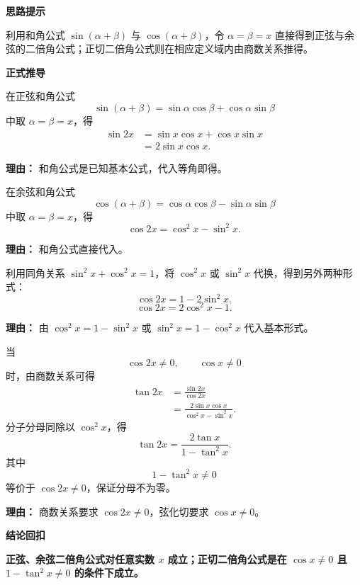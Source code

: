 \begin{proofbox}

	\textbf{\textcolor{CProof}{思路提示}}

	利用和角公式 $\sin(\alpha+\beta)$ 与 $\cos(\alpha+\beta)$，令 $\alpha=\beta=x$ 直接得到正弦与余弦的二倍角公式；正切二倍角公式则在相应定义域内由商数关系推得。

	\medskip
	\textbf{\textcolor{CProof}{正式推导}}
	\begin{description}[style=nextline, leftmargin=2.8em, labelsep=0.5em, itemsep=0.55em]
		\item[\textbf{步骤一（正弦二倍角）：}]
		      在正弦和角公式
		      \[
			      \sin(\alpha+\beta) = \sin\alpha\cos\beta + \cos\alpha\sin\beta
		      \]
		      中取 $\alpha = \beta = x$，得
		      \[
			      \begin{aligned}
				      \sin 2x & = \sin x \cos x + \cos x \sin x \\
				              & = 2\sin x \cos x.
			      \end{aligned}
		      \]
		      \par\textbf{理由：} 和角公式是已知基本公式，代入等角即得。

		\item[\textbf{步骤二（余弦基本形式）：}]
		      在余弦和角公式
		      \[
			      \cos(\alpha+\beta) = \cos\alpha\cos\beta - \sin\alpha\sin\beta
		      \]
		      中取 $\alpha = \beta = x$，得
		      \[
			      \cos 2x = \cos^2 x - \sin^2 x.
		      \]
		      \par\textbf{理由：} 和角公式直接代入。

		\item[\textbf{步骤三（余弦变形）：}]
		      利用同角关系 $\sin^2 x + \cos^2 x = 1$，将 $\cos^2 x$ 或 $\sin^2 x$ 代换，得到另外两种形式：
		      \[
			      \cos 2x = 1 - 2\sin^2 x.
		      \]
		      \[
			      \cos 2x = 2\cos^2 x - 1.
		      \]
		      \par\textbf{理由：} 由 $\cos^2 x = 1 - \sin^2 x$ 或 $\sin^2 x = 1 - \cos^2 x$ 代入基本形式。

		\item[\textbf{步骤四（正切二倍角）：}]
		      当
		      \[
			      \cos 2x\ne0,\qquad \cos x\ne0
		      \]
		      时，由商数关系可得
		      \[
			      \begin{aligned}
				      \tan 2x
				       & = \frac{\sin 2x}{\cos 2x}                  \\
				       & = \frac{2\sin x\cos x}{\cos^2 x-\sin^2 x}.
			      \end{aligned}
		      \]
		      分子分母同除以 $\cos^2 x$，得
		      \[
			      \tan 2x = \frac{2\tan x}{1-\tan^2 x}.
		      \]
		      其中
		      \[
			      1-\tan^2x\ne0
		      \]
		      等价于 $\cos 2x\ne0$，保证分母不为零。
		      \par\textbf{理由：} 商数关系要求 $\cos 2x\ne0$，弦化切要求 $\cos x\ne0$。
	\end{description}

	\medskip
	\textbf{\textcolor{CProof}{结论回扣}}

	\textbf{正弦、余弦二倍角公式对任意实数 $x$ 成立；正切二倍角公式是在 $\cos x\ne0$ 且 $1-\tan^2x\ne0$ 的条件下成立。}

\end{proofbox}
